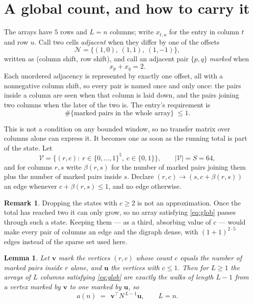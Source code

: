 \documentclass[11pt,a4paper]{article}
\theoremstyle{plain}
\newtheorem{lemma}[theorem]{Lemma}
\theoremstyle{definition}
\newtheorem{remark}[theorem]{Remark}
\begin{document}
\section{A global count, and how to carry it}

The arrays have $5$ rows and $L=n$ columns; write $x_{t,u}$ for the entry in
column $t$ and row $u$. Call two cells \emph{adjacent} when they differ by one of the
offsets
\[
\mathcal N=\{(1,0),\ (1,1),\ (1,-1)\},
\]
written as (column shift, row shift), and call an adjacent pair $\{p,q\}$
\emph{marked} when
\[
x_{p}+x_{q}=2 .
\]
Each unordered adjacency is represented by exactly one offset, all with a nonnegative column
shift, so every pair is named once and only once: the pairs inside a column are seen when
that column is laid down, and the pairs joining two columns when the later of the two is. The
entry's requirement is
\begin{equation}\label{eq:glob}
\#\{\text{marked pairs in the whole array}\}\;\le1.
\end{equation}

This is not a condition on any bounded window, so no transfer matrix over columns alone can
express it. It becomes one as soon as the running total is part of the state. Let
\[
\mathcal V=\bigl\{(r,c):\ r\in\{0,\dots,1\}^{5},\ c\in\{0,1\}\bigr\},
\qquad |\mathcal V|=S=64,
\]
and for columns $r,s$ write $\beta(r,s)$ for the number of marked pairs joining them plus the
number of marked pairs inside $s$. Declare $(r,c)\to(s,c+\beta(r,s))$ an edge whenever
$c+\beta(r,s)\le1$, and no edge otherwise.

\begin{remark}
Dropping the states with $c\ge2$ is not an approximation. Once the total has reached two it
can only grow, so no array satisfying \eqref{eq:glob} passes through such a state. Keeping
them --- as a third, absorbing value of $c$ --- would make every pair of columns an edge and
the digraph dense, with $(1+1)^{2\cdot5}$ edges instead of the sparse set used here.
\end{remark}

\begin{lemma}\label{lem:walk}
Let $\mathbf{v}$ mark the vertices $(r,c)$ whose count $c$ equals the number of marked pairs
inside $r$ alone, and $\mathbf{u}$ the vertices with $c\le1$. Then for $L\ge1$ the arrays
of $L$ columns satisfying \eqref{eq:glob} are exactly the walks of length $L-1$ from a
vertex marked by $\mathbf{v}$ to one marked by $\mathbf{u}$, so
\[
a(n)\;=\;\,\mathbf{v}^{\!\top}N^{\,L-1}\mathbf{u},\qquad L=n .
\]
\end{lemma}
\end{document}
